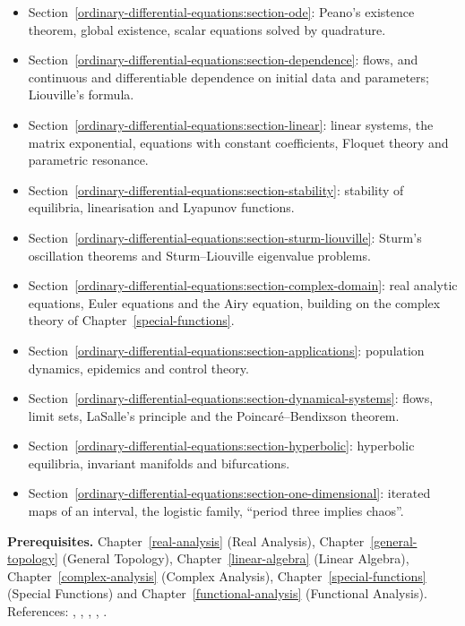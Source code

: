 \begin{itemize}
\item Section~\ref{ordinary-differential-equations:section-ode}: Peano's existence theorem, global existence, scalar equations solved by quadrature.
\item Section~\ref{ordinary-differential-equations:section-dependence}: flows, and continuous and differentiable dependence on initial data and parameters; Liouville's formula.
\item Section~\ref{ordinary-differential-equations:section-linear}: linear systems, the matrix exponential, equations with constant coefficients, Floquet theory and parametric resonance.
\item Section~\ref{ordinary-differential-equations:section-stability}: stability of equilibria, linearisation and Lyapunov functions.
\item Section~\ref{ordinary-differential-equations:section-sturm-liouville}: Sturm's oscillation theorems and Sturm--Liouville eigenvalue problems.
\item Section~\ref{ordinary-differential-equations:section-complex-domain}: real analytic equations, Euler equations and the Airy equation, building on the complex theory of Chapter~\ref{special-functions}.
\item Section~\ref{ordinary-differential-equations:section-applications}: population dynamics, epidemics and control theory.
\item Section~\ref{ordinary-differential-equations:section-dynamical-systems}: flows, limit sets, LaSalle's principle and the Poincar\'e--Bendixson theorem.
\item Section~\ref{ordinary-differential-equations:section-hyperbolic}: hyperbolic equilibria, invariant manifolds and bifurcations.
\item Section~\ref{ordinary-differential-equations:section-one-dimensional}: iterated maps of an interval, the logistic family, ``period three implies chaos''.
\end{itemize}

\noindent\textbf{Prerequisites.} Chapter~\ref{real-analysis} (Real Analysis), Chapter~\ref{general-topology} (General Topology), Chapter~\ref{linear-algebra} (Linear Algebra), Chapter~\ref{complex-analysis} (Complex Analysis),
Chapter~\ref{special-functions} (Special Functions) and Chapter~\ref{functional-analysis} (Functional Analysis). References: \cite{hartman-ode}, \cite{coddington-levinson}, \cite{teschl-ode}, \cite{hirsch-smale-devaney}, \cite{guckenheimer-holmes}.

